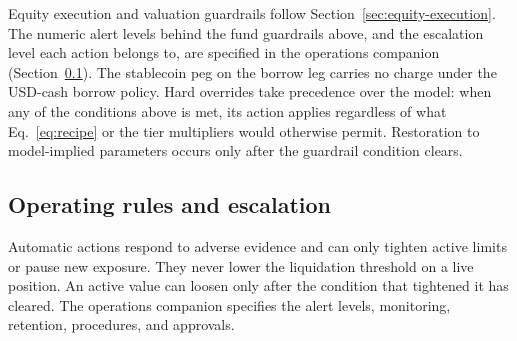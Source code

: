 Equity execution and valuation guardrails follow Section~\ref{sec:equity-execution}. The numeric alert levels behind the fund guardrails above, and the escalation level each action belongs to, are specified in the operations companion (Section~\ref{sec:operations}). The stablecoin peg on the borrow leg carries no charge under the USD-cash borrow policy. Hard overrides take precedence over the model: when any of the conditions above is met, its action applies regardless of what Eq.~\eqref{eq:recipe} or the tier multipliers would otherwise permit. Restoration to model-implied parameters occurs only after the guardrail condition clears.

\subsection{Operating rules and escalation}\label{sec:operations}
Automatic actions respond to adverse evidence and can only tighten active limits or pause new exposure. They never lower the liquidation threshold on a live position. An active value can loosen only after the condition that tightened it has cleared. The operations companion specifies the alert levels, monitoring, retention, procedures, and approvals.
